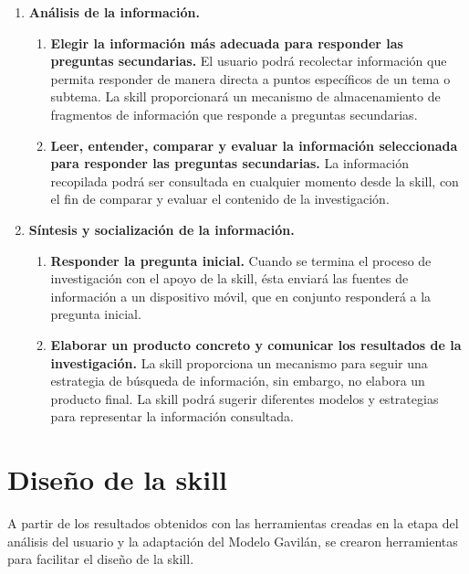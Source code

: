 \begin{enumerate}
\begin{enumerate}[1.]
  \end{enumerate}
  \item \textbf{Análisis de la información.}
  \begin{enumerate}[1.]
    \item \textbf{Elegir la información más adecuada para responder las preguntas secundarias.} El usuario podrá recolectar información que permita responder de manera directa a puntos específicos de un tema o subtema. La skill proporcionará un mecanismo de almacenamiento de fragmentos de información que responde a preguntas secundarias.
    \item \textbf{Leer, entender, comparar y evaluar la información seleccionada para responder las preguntas secundarias.} La información recopilada podrá ser consultada en cualquier momento desde la skill, con el fin de comparar y evaluar el contenido de la investigación.
  \end{enumerate}
  \item \textbf{Síntesis y socialización de la información.}
  \begin{enumerate}[1.]
    \item \textbf{Responder la pregunta inicial.} Cuando se termina el proceso de investigación con el apoyo de la skill, ésta enviará las fuentes de información a un dispositivo móvil, que en conjunto responderá a la pregunta inicial.
    \item \textbf{Elaborar un producto concreto y comunicar los resultados de la investigación.} La skill proporciona un mecanismo para seguir una estrategia de búsqueda de información, sin embargo, no elabora un producto final. La skill podrá sugerir diferentes modelos y estrategias para representar la información consultada.
  \end{enumerate}
\end{enumerate}


\section{Diseño de la skill}
\label{DisenioSkillcapIV}

A partir de los resultados obtenidos con las herramientas creadas en la etapa del análisis del usuario y la adaptación del Modelo Gavilán, se crearon herramientas para facilitar el diseño de la skill.

